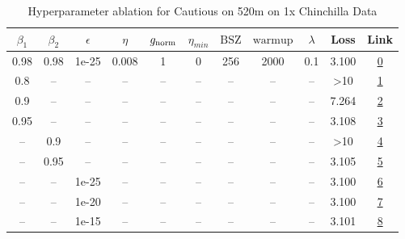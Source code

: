 \begin{table}[H]
\centering
\caption{Hyperparameter ablation for Cautious on 520m on 1x Chinchilla Data}
\label{tab:ablation_cautious_520m_on_1x_chinchilla_data}
\begin{tabular}{ccccccccccc}
\toprule
$\beta_1$ & $\beta_2$ & $\epsilon$ & $\eta$ & $g_{\mathrm{norm}}$ & $\eta_{min}$ & $\mathrm{BSZ}$ & $\mathrm{warmup}$ & $\lambda$ & Loss & Link \\
\midrule
0.98 & 0.98 & 1e-25 & 0.008 & 1 & 0 & 256 & 2000 & 0.1 & 3.100 & \href{https://wandb.ai/marin-community/optimizer-scaling/runs/sweep-520m-10B-cautiouscda486lr0.008-wd0.1-minlr0-warmup2000-b10-1d8924}{0} \\
\midrule
0.8 & -- & -- & -- & -- & -- & -- & -- & -- & >10 & \href{https://wandb.ai/marin-community/optimizer-scaling/runs/sweep-520m-10B-cautioush937574lr0.008-wd0.1-minlr0-warmup2000-b1-288d18}{1} \\
0.9 & -- & -- & -- & -- & -- & -- & -- & -- & 7.264 & \href{https://wandb.ai/marin-community/optimizer-scaling/runs/sweep-520m-10B-cautiousfe5526lr0.008-wd0.1-minlr0-warmup2000-b10-a0ea38}{2} \\
0.95 & -- & -- & -- & -- & -- & -- & -- & -- & 3.108 & \href{https://wandb.ai/marin-community/optimizer-scaling/runs/sweep-520m-10B-cautiousb9bea7lr0.008-wd0.1-minlr0-warmup2000-b10-4e055f}{3} \\
-- & 0.9 & -- & -- & -- & -- & -- & -- & -- & >10 & \href{https://wandb.ai/marin-community/optimizer-scaling/runs/sweep-520m-10B-cautiousfa5ab7lr0.008-wd0.1-minlr0-warmup2000-b10-fc260f}{4} \\
-- & 0.95 & -- & -- & -- & -- & -- & -- & -- & 3.105 & \href{https://wandb.ai/marin-community/optimizer-scaling/runs/sweep-520m-10B-cautious06f834lr0.008-wd0.1-minlr0-warmup2000-b10-e18beb}{5} \\
-- & -- & 1e-25 & -- & -- & -- & -- & -- & -- & 3.100 & \href{https://wandb.ai/marin-community/optimizer-scaling/runs/sweep-520m-10B-cautiouscda486lr0.008-wd0.1-minlr0-warmup2000-b10-1d8924}{6} \\
-- & -- & 1e-20 & -- & -- & -- & -- & -- & -- & 3.100 & \href{https://wandb.ai/marin-community/optimizer-scaling/runs/sweep-520m-10B-cautious635735lr0.008-wd0.1-minlr0-warmup2000-b10-d30ff8}{7} \\
-- & -- & 1e-15 & -- & -- & -- & -- & -- & -- & 3.101 & \href{https://wandb.ai/marin-community/optimizer-scaling/runs/sweep-520m-10B-cautiousfba4cdlr0.008-wd0.1-minlr0-warmup2000-b10-bfcfff}{8} \\

\end{tabular}
\end{table}
